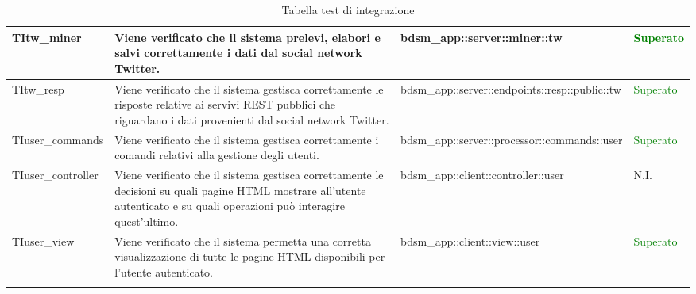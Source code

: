 \begin{center}
\begin{longtable}{| p{3.6cm} | p{4.2cm} | p{3cm} | p{1.7cm} |}
					\hline
					TItw\_miner & Viene verificato che il sistema prelevi, elabori e salvi correttamente i dati dal social network Twitter. & bdsm\_app::\-server::\-miner::\-tw & \textcolor{green}{Superato}\\
					\hline
					TItw\_resp & Viene verificato che il sistema gestisca correttamente le risposte relative ai servivi REST pubblici che riguardano i dati provenienti dal social network Twitter. & bdsm\_app::\-server::\-endpoints::\-resp::\-public::\-tw & \textcolor{green}{Superato}\\
					\hline
					TIuser\_commands & Viene verificato che il sistema gestisca correttamente i comandi relativi alla gestione degli utenti.  & bdsm\_app::\-server::\-processor::\-commands::\-user & \textcolor{green}{Superato}\\
					\hline
					TIuser\_controller & Viene verificato che il sistema gestisca correttamente le decisioni su quali pagine HTML mostrare all'utente autenticato e su quali operazioni può interagire quest'ultimo. & bdsm\_app::\-client::\-controller::\-user & N.I.\\
					\hline
					TIuser\_view & Viene verificato che il sistema permetta una corretta visualizzazione di tutte le pagine HTML disponibili per l'utente autenticato. & bdsm\_app::\-client::\-view::\-user & \textcolor{green}{Superato}\\
					\hline
			\caption{Tabella test di integrazione}
			\end{longtable}
				\egroup
\end{center}


